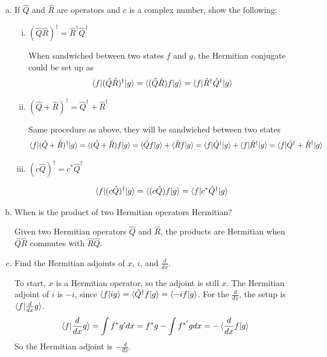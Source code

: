 \documentclass[10pt,letterpaper]{article}
\begin{document}
\begin{enumerate}
\begin{enumerate}[a)]

\item If $\hat{Q}$ and $\hat{R}$ are operators and $c$ is a complex number, show the following:

\begin{enumerate}[i)]

\item $(\hat{Q}\hat{R})^{\dagger} = \hat{R}^{\dagger}\hat{Q}^{\dagger}$

\color{violet}
When sandwiched between two states $f$ and $g$, the Hermitian conjugate could be set up as
$$\braket{f | (\hat{Q}\hat{R})^{\dagger} | g} = \braket{(\hat{Q}\hat{R})f|g} = \braket{f | \hat{R}^{\dagger}\hat{Q}^{\dagger} | g}$$
\color{black}

\item $(\hat{Q} + \hat{R})^{\dagger} = \hat{Q}^{\dagger} + \hat{R}^{\dagger}$

\color{violet}
Same procedure as above, they will be sandwiched between two states
$$\braket{f | (\hat{Q} + \hat{R})^{\dagger} | g} = \braket{(\hat{Q} + \hat{R})f | g} = \braket{\hat{Q}f|g} + \braket{\hat{R}f | g} = \braket{f | \hat{Q}^{\dagger} | g} + \braket{f | \hat{R}^{\dagger} | g} = \braket{f | \hat{Q}^{\dagger} + \hat{R}^{\dagger} | g}$$
\color{black}

\item $(c\hat{Q})^{\dagger} = c^{*}\hat{Q}^{\dagger}$

\color{violet}
$$\braket{f | (c\hat{Q})^{\dagger} | g} = \braket{(c\hat{Q}) f | g} = \braket{f | c^{*}\hat{Q}^{\dagger} | g}$$
\color{black}

\end{enumerate}

\item When is the product of two Hermitian operators Hermitian?

\color{violet}
Given two Hermitian operators $\hat{Q}$ and $\hat{R}$, the products are Hermitian when $\hat{Q}\hat{R}$ commutes with $\hat{R}\hat{Q}$. 
\color{black}

\item Find the Hermitian adjoints of $x$, $i$, and $\frac{d}{dx}$. 

\color{violet}
To start, $x$ is a Hermitian operator, so the adjoint is still $x$. The Hermitian adjoint of $i$ is $-i$, since $\braket{f|ig} = \braket{\hat{Q}^{\dagger} f | g} = \braket{-if | g}$. For the $\frac{d}{dx}$, the setup is $\braket{f | \frac{d}{dx} g}$. 
$$\braket{f | \frac{d}{dx} g} = \int f^{*}g' dx = f^{*}g - \int f^{*'}gdx = -\braket{\frac{d}{dx} f | g}$$
So the Hermitian adjoint is $-\frac{d}{dx}$. 
\color{black}


\end{enumerate}
\end{enumerate}
\end{document}
